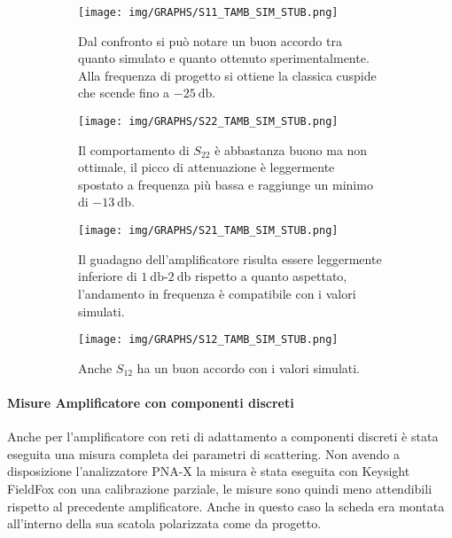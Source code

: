 \documentclass[12pt,oneside]{book}
\begin{document}
\begin{figure}[!htbp]
    \centering
    \begin{subfigure}[t]{0.48\textwidth}
        \centering
        \texttt{[image: img/GRAPHS/S11\_TAMB\_SIM\_STUB.png]}
        \caption{Dal confronto si può notare un buon accordo tra quanto simulato e quanto ottenuto sperimentalmente. Alla frequenza di progetto si ottiene la classica cuspide che scende fino a $\SI{-25}{\decibel}$.}
    \end{subfigure}
    \hfill
    \begin{subfigure}[t]{0.48\textwidth}
        \centering
        \texttt{[image: img/GRAPHS/S22\_TAMB\_SIM\_STUB.png]}
        \caption{Il comportamento di $S_{22}$ è abbastanza buono ma non ottimale, il picco di attenuazione è leggermente spostato a frequenza più bassa e raggiunge un minimo di $\SI{-13}{\decibel}$.}
    \end{subfigure}
    \hfill
    \centering
    \begin{subfigure}[t]{0.48\textwidth}
        \centering
        \texttt{[image: img/GRAPHS/S21\_TAMB\_SIM\_STUB.png]}
        \caption{Il guadagno dell'amplificatore risulta essere leggermente inferiore di $\SI{1}{\decibel}$-$\SI{2}{\decibel}$ rispetto a quanto aspettato, l'andamento in frequenza è compatibile con i valori simulati.}
    \end{subfigure}
    \hfill
    \begin{subfigure}[t]{0.48\textwidth}
        \centering
        \texttt{[image: img/GRAPHS/S12\_TAMB\_SIM\_STUB.png]}
        \caption{Anche $S_{12}$ ha un buon accordo con i valori simulati.}
    \end{subfigure}
    \caption{}
    \label{amb_stub}
\end{figure}

\paragraph{Misure Amplificatore con componenti discreti}

Anche per l'amplificatore con reti di adattamento a componenti discreti è stata eseguita una misura completa dei parametri di scattering. Non avendo a disposizione l'analizzatore PNA-X la misura è stata eseguita con Keysight FieldFox con una calibrazione parziale, le misure sono quindi meno attendibili rispetto al precedente amplificatore. Anche in questo caso la scheda era montata all'interno della sua scatola polarizzata come da progetto.
\end{document}
